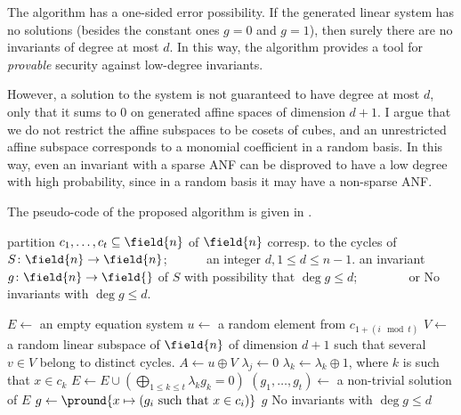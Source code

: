 \begin{remark}
The algorithm has a one-sided error possibility. If the generated linear system has no solutions (besides the constant ones $g=0$ and $g=1$), then surely there are no invariants of degree at most $d$. In this way, the algorithm provides a tool for \emph{provable} security against low-degree invariants.

However, a solution to the system is not guaranteed to have degree at most $d$, only that it sums to 0 on generated affine spaces of dimension $d+1$. I argue that we do not restrict the affine subspaces to be cosets of cubes, and an unrestricted affine subspace corresponds to a monomial coefficient in a random basis. In this way, even an invariant with a sparse ANF can be disproved to have a low degree with high probability, since in a random basis it may have a non-sparse ANF.
\end{remark}

The pseudo-code of the proposed algorithm is given in .

\begin{algorithm}
    \begin{algorithmic}[1]
    \Require partition $c_1,\ldots,c_t \subseteq \field{n}$ of $\field{n}$ corresp. to the cycles of $S\colon \field{n} \to \field{n}$;
        \Statex~~~~~ an integer $d, 1 \le d \le n-1$.
    \Ensure an invariant $g\colon \field{n} \to \field{}$ of $S$ with possibility that $\deg{g} \le d$;
        \Statex~~~~~~~ or \textsf{No invariants with $\deg{g} \le d$}.
    
    \State $E \gets$ an empty equation system
        \State $u \gets$ a random element from $c_{1+(i\mod t)}$
        \State $V \gets$ a random linear subspace of $\field{n}$ of dimension $d+1$
        \Statex \hspace{0.55cm}such that several $v \in V$ belong to distinct cycles.
        \State $A \gets u \oplus V$
            \State $\lambda_j \gets 0$
        \EndFor
            \State $\lambda_k \gets \lambda_k \oplus 1$, where $k$ is such that $x \in c_k$
        \EndFor
        \State $E \gets E \cup (\bigoplus_{1 \le k \le t} \lambda_k g_k = 0)$
    \EndFor
        \State $(g_1,\ldots,g_t) \gets$ a non-trivial solution of $E$
        \State $g \gets \pround{x \mapsto (g_i~\text{such that}~x \in c_i)}$
        \State \Return $g$
    \Else
        \State \Return \textsf{No invariants with $\deg{g} \le d$}
    \EndIf
    \end{algorithmic}
\end{algorithm}


